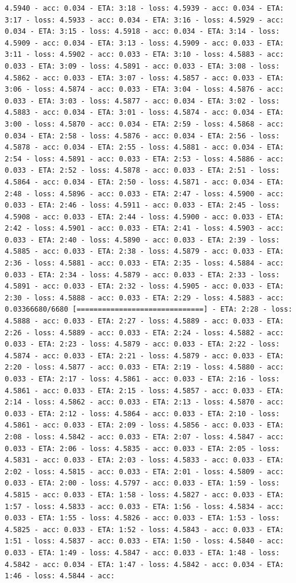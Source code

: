 \documentclass[11pt]{article}
\begin{document}
\begin{Verbatim}[commandchars=\\\{\}]
4.5940 - acc: 0.034 - ETA: 3:18 - loss: 4.5939 - acc: 0.034 - ETA: 3:17 - loss: 4.5933 - acc: 0.034 - ETA: 3:16 - loss: 4.5929 - acc: 0.034 - ETA: 3:15 - loss: 4.5918 - acc: 0.034 - ETA: 3:14 - loss: 4.5909 - acc: 0.034 - ETA: 3:13 - loss: 4.5909 - acc: 0.033 - ETA: 3:11 - loss: 4.5902 - acc: 0.033 - ETA: 3:10 - loss: 4.5883 - acc: 0.033 - ETA: 3:09 - loss: 4.5891 - acc: 0.033 - ETA: 3:08 - loss: 4.5862 - acc: 0.033 - ETA: 3:07 - loss: 4.5857 - acc: 0.033 - ETA: 3:06 - loss: 4.5874 - acc: 0.033 - ETA: 3:04 - loss: 4.5876 - acc: 0.033 - ETA: 3:03 - loss: 4.5877 - acc: 0.034 - ETA: 3:02 - loss: 4.5883 - acc: 0.034 - ETA: 3:01 - loss: 4.5874 - acc: 0.034 - ETA: 3:00 - loss: 4.5870 - acc: 0.034 - ETA: 2:59 - loss: 4.5868 - acc: 0.034 - ETA: 2:58 - loss: 4.5876 - acc: 0.034 - ETA: 2:56 - loss: 4.5878 - acc: 0.034 - ETA: 2:55 - loss: 4.5881 - acc: 0.034 - ETA: 2:54 - loss: 4.5891 - acc: 0.033 - ETA: 2:53 - loss: 4.5886 - acc: 0.033 - ETA: 2:52 - loss: 4.5878 - acc: 0.033 - ETA: 2:51 - loss: 4.5864 - acc: 0.034 - ETA: 2:50 - loss: 4.5871 - acc: 0.034 - ETA: 2:48 - loss: 4.5896 - acc: 0.033 - ETA: 2:47 - loss: 4.5900 - acc: 0.033 - ETA: 2:46 - loss: 4.5911 - acc: 0.033 - ETA: 2:45 - loss: 4.5908 - acc: 0.033 - ETA: 2:44 - loss: 4.5900 - acc: 0.033 - ETA: 2:42 - loss: 4.5901 - acc: 0.033 - ETA: 2:41 - loss: 4.5903 - acc: 0.033 - ETA: 2:40 - loss: 4.5890 - acc: 0.033 - ETA: 2:39 - loss: 4.5885 - acc: 0.033 - ETA: 2:38 - loss: 4.5879 - acc: 0.033 - ETA: 2:36 - loss: 4.5881 - acc: 0.033 - ETA: 2:35 - loss: 4.5884 - acc: 0.033 - ETA: 2:34 - loss: 4.5879 - acc: 0.033 - ETA: 2:33 - loss: 4.5891 - acc: 0.033 - ETA: 2:32 - loss: 4.5905 - acc: 0.033 - ETA: 2:30 - loss: 4.5888 - acc: 0.033 - ETA: 2:29 - loss: 4.5883 - acc: 0.03366680/6680 [==============================] - ETA: 2:28 - loss: 4.5888 - acc: 0.033 - ETA: 2:27 - loss: 4.5889 - acc: 0.033 - ETA: 2:26 - loss: 4.5889 - acc: 0.033 - ETA: 2:24 - loss: 4.5882 - acc: 0.033 - ETA: 2:23 - loss: 4.5879 - acc: 0.033 - ETA: 2:22 - loss: 4.5874 - acc: 0.033 - ETA: 2:21 - loss: 4.5879 - acc: 0.033 - ETA: 2:20 - loss: 4.5877 - acc: 0.033 - ETA: 2:19 - loss: 4.5880 - acc: 0.033 - ETA: 2:17 - loss: 4.5861 - acc: 0.033 - ETA: 2:16 - loss: 4.5861 - acc: 0.033 - ETA: 2:15 - loss: 4.5857 - acc: 0.033 - ETA: 2:14 - loss: 4.5862 - acc: 0.033 - ETA: 2:13 - loss: 4.5870 - acc: 0.033 - ETA: 2:12 - loss: 4.5864 - acc: 0.033 - ETA: 2:10 - loss: 4.5861 - acc: 0.033 - ETA: 2:09 - loss: 4.5856 - acc: 0.033 - ETA: 2:08 - loss: 4.5842 - acc: 0.033 - ETA: 2:07 - loss: 4.5847 - acc: 0.033 - ETA: 2:06 - loss: 4.5835 - acc: 0.033 - ETA: 2:05 - loss: 4.5831 - acc: 0.033 - ETA: 2:03 - loss: 4.5833 - acc: 0.033 - ETA: 2:02 - loss: 4.5815 - acc: 0.033 - ETA: 2:01 - loss: 4.5809 - acc: 0.033 - ETA: 2:00 - loss: 4.5797 - acc: 0.033 - ETA: 1:59 - loss: 4.5815 - acc: 0.033 - ETA: 1:58 - loss: 4.5827 - acc: 0.033 - ETA: 1:57 - loss: 4.5833 - acc: 0.033 - ETA: 1:56 - loss: 4.5834 - acc: 0.033 - ETA: 1:55 - loss: 4.5826 - acc: 0.033 - ETA: 1:53 - loss: 4.5825 - acc: 0.033 - ETA: 1:52 - loss: 4.5843 - acc: 0.033 - ETA: 1:51 - loss: 4.5837 - acc: 0.033 - ETA: 1:50 - loss: 4.5840 - acc: 0.033 - ETA: 1:49 - loss: 4.5847 - acc: 0.033 - ETA: 1:48 - loss: 4.5842 - acc: 0.034 - ETA: 1:47 - loss: 4.5842 - acc: 0.034 - ETA: 1:46 - loss: 4.5844 - acc: 
\end{Verbatim}
\end{document}
